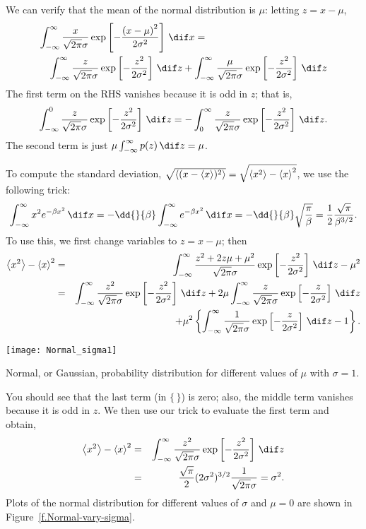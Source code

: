 We can verify that the mean of the normal distribution is $\mu$: letting $z = x-\mu$,
\begin{eqnarray*}
\lefteqn{\int_{-\infty}^{\infty} \frac{x}{\sqrt{2\pi}\sigma} \exp\left[-\frac{\left(x-\mu\right)^{2}}{2\sigma^{2}}\right] \,\dif x = }  \\
	&& \int_{-\infty}^{\infty} \frac{z}{\sqrt{2\pi}\sigma} \exp\left[-\frac{z^{2}}{2\sigma^{2}}\right] \,\dif z + \int_{-\infty}^{\infty} \frac{\mu}{\sqrt{2\pi}\sigma} \exp\left[-\frac{z^{2}}{2\sigma^{2}}\right] \,\dif z 
\end{eqnarray*}
The first term on the RHS vanishes because it is odd in $z$; that is,
\[ 
	\int_{-\infty}^{0} \frac{z}{\sqrt{2\pi}\sigma} \exp\left[-\frac{z^{2}}{2\sigma^{2}}\right] \,\dif z = -\int_{0}^{\infty} \frac{z}{\sqrt{2\pi}\sigma} \exp\left[-\frac{z^{2}}{2\sigma^{2}}\right] \,\dif z.
\]
The second term is just $\mu \int_{-\infty}^{\infty} p(z)\,\dif z = \mu$.

To compute the standard deviation, $\sqrt{\left\langle(x-\left\langle x\right\rangle)^{2}\right\rangle} = \sqrt{\left\langle x^{2}\right\rangle-\left\langle x\right\rangle^{2}}$, 
we use the following trick:
\[
	\int_{-\infty}^{\infty}x^{2}e^{-\beta x^{2}}\,\dif x 
		= -\dd{}{\beta}\int_{-\infty}^{\infty}e^{-\beta x^{2}}\,\dif x = -\dd{}{\beta}\sqrt{\frac{\pi}{\beta}} = \frac{1}{2}\frac{\sqrt{\pi}}{\beta^{3/2}}.
\]
To use this, we first change variables to $z = x-\mu$; then
\begin{eqnarray*}
	\mean{x^{2}} - \mean{x}^{2} &=& \int_{-\infty}^{\infty}\frac{z^{2}+2z\mu+\mu^{2}}{\sqrt{2\pi}\sigma} \exp\left[-\frac{z^{2}}{2\sigma^{2}}\right]\,\dif z - \mu^{2}\\
		&=& \int_{-\infty}^{\infty}\frac{z^{2}}{\sqrt{2\pi}\sigma} \exp\left[-\frac{z^{2}}{2\sigma^{2}}\right]\,\dif z + 2\mu \int_{-\infty}^{\infty}\frac{z}{\sqrt{2\pi}\sigma} \exp\left[-\frac{z}{2\sigma^{2}}\right]\,\dif z \\
		&& + \mu^{2}\left\{ \int_{-\infty}^{\infty} \frac{1}{\sqrt{2\pi}\sigma} \exp\left[-\frac{z}{2\sigma^{2}}\right]\,\dif z - 1\right\}.
\end{eqnarray*}
\begin{marginfigure}
\texttt{[image: Normal\_sigma1]}
\caption[Normal distributions with different means]{Normal, or Gaussian, probability distribution for different values of $\mu$ with $\sigma=1$.}
\label{f.Normal-vary-mu}
\end{marginfigure}
You should see that the last term (in $\{\,\}$) is zero; also, the middle term vanishes because it is odd in $z$.  We then use our trick to evaluate the first term and obtain,
\begin{eqnarray*}
	\mean{x^{2}} - \mean{x}^{2} &=& \int_{-\infty}^{\infty}\frac{z^{2}}{\sqrt{2\pi}\sigma} \exp\left[-\frac{z^{2}}{2\sigma^{2}}\right]\,\dif z \\
	&=& \frac{\sqrt{\pi}}{2}(2\sigma^{2})^{3/2}\frac{1}{\sqrt{2\pi}\sigma} = \sigma^{2}.
\end{eqnarray*}
Plots of the normal distribution for different values of $\sigma$ and $\mu=0$ are shown in Figure~\ref{f.Normal-vary-sigma}.

